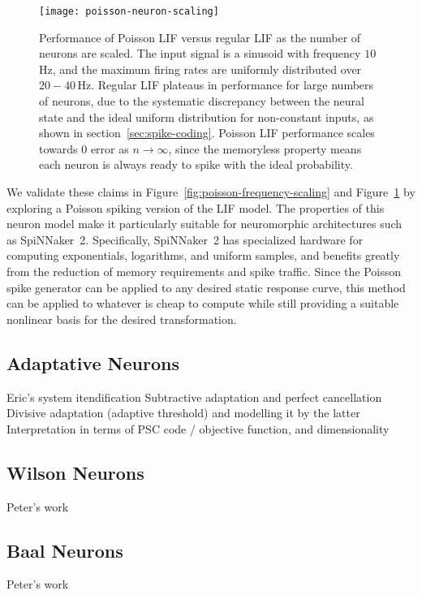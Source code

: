 \begin{figure}
\centering
\texttt{[image: poisson-neuron-scaling]}
\caption{\label{fig:poisson-neuron-scaling} Performance of Poisson LIF versus regular LIF as the number of neurons are scaled.
The input signal is a sinusoid with frequency $10$\,Hz, and the maximum firing rates are uniformly distributed over $20-40$\,Hz.
Regular LIF plateaus in performance for large numbers of neurons, due to the systematic discrepancy between the neural state and the ideal uniform distribution for non-constant inputs, as shown in section~\ref{sec:spike-coding}.
Poisson LIF performance scales towards $0$ error as $n \rightarrow \infty$, since the memoryless property means each neuron is always ready to spike with the ideal probability. 
}
\end{figure}

We validate these claims in Figure~\ref{fig:poisson-frequency-scaling} and Figure~\ref{fig:poisson-neuron-scaling} by exploring a Poisson spiking version of the LIF model.
The properties of this neuron model make it particularly suitable for neuromorphic architectures such as SpiNNaker~2.
Specifically, SpiNNaker~2 has specialized hardware for computing exponentials, logarithms, and uniform samples, and benefits greatly from the reduction of memory requirements and spike traffic.
Since the Poisson spike generator can be applied to any desired static response curve, this method can be applied to whatever is cheap to compute while still providing a suitable nonlinear basis for the desired transformation.

\subsection{Adaptative Neurons}

Eric's system itendification
Subtractive adaptation and perfect cancellation
Divisive adaptation (adaptive threshold) and modelling it by the latter
Interpretation in terms of PSC code / objective function, and dimensionality

\subsection{Wilson Neurons}

Peter's work

\subsection{Baal Neurons}

Peter's work
